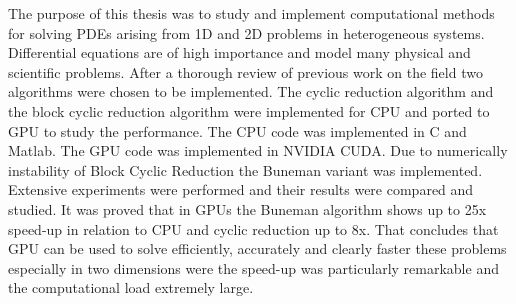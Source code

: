 
The purpose of this thesis was to study and implement computational methods for solving PDEs arising from 1D and 2D problems in heterogeneous systems. Differential equations are of high importance and model many physical and scientific problems. After a thorough review of previous work on the field two algorithms were chosen to be implemented. The cyclic reduction algorithm and the block cyclic reduction algorithm were implemented for CPU and ported to GPU to study the performance. The CPU code was implemented in C and Matlab. The GPU code was implemented in NVIDIA CUDA. Due to numerically instability of Block Cyclic Reduction the Buneman variant was implemented. Extensive experiments were performed and their results were compared and studied. It was proved that in GPUs the Buneman algorithm shows up to 25x speed-up in relation to CPU and cyclic reduction up to 8x. That concludes that GPU can be used to solve efficiently, accurately and clearly faster these problems especially in two dimensions were the speed-up was particularly remarkable and the computational load extremely large.